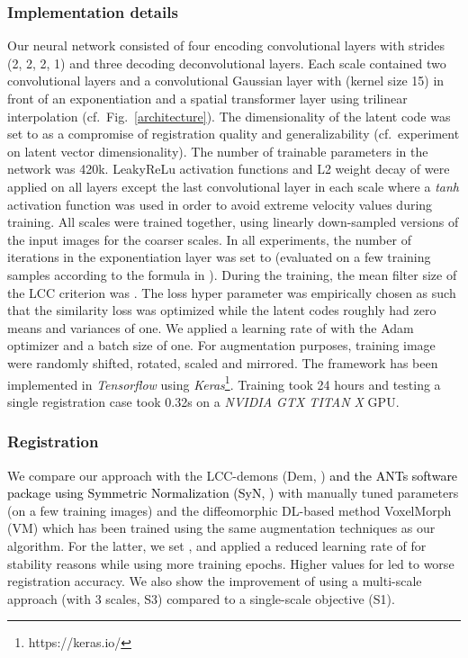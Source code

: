 \documentclass[journal]{IEEEtran}
\newcommand{\update}[1]{\textcolor{black}{#1}}
\begin{document}
\subsubsection{Implementation details} Our neural network consisted of four encoding convolutional layers with strides (2, 2, 2, 1) and three decoding deconvolutional layers. Each scale contained two convolutional layers and a convolutional Gaussian layer with  (kernel size 15) in front of an exponentiation and a spatial transformer layer using trilinear interpolation (cf.~Fig.\ \ref{architecture}). The dimensionality of the latent code  was set to  as a compromise of registration quality and generalizability (cf.\ experiment on latent vector dimensionality). The number of trainable parameters in the network was 420k. LeakyReLu activation functions and L2 weight decay of  were applied on all layers except the last convolutional layer in each scale where a \emph{tanh} activation function was used in order to avoid extreme velocity values during training. All scales were trained together, using linearly down-sampled versions of the input images for the coarser scales. In all experiments, the number of iterations in the exponentiation layer was set to   (evaluated on a few training samples according to the formula in \cite{arsigny2006log}). During the training, the mean filter size of the LCC criterion was . The loss hyper parameter was empirically chosen as  such that the similarity loss was optimized while the latent codes roughly had zero means and variances of one. We applied a learning rate of  with the Adam optimizer and a batch size of one. For augmentation purposes, training image were randomly shifted, rotated, scaled and mirrored. The framework has been implemented in \textit{Tensorflow} using \textit{Keras}\footnote{https://keras.io/}. Training took 24 hours and testing a single registration case took 0.32s on a \textit{NVIDIA GTX TITAN X} GPU. 

\subsubsection{Registration}
We compare our approach with the LCC-demons (Dem, \cite{lorenzi2013lcc}) \update{and the ANTs software package using Symmetric Normalization (SyN, \cite{avants2008symmetric})} with manually tuned parameters (on a few training images) and the diffeomorphic DL-based method VoxelMorph \cite{dalca2018unsupervised} (VM) which has been trained using the same augmentation techniques as our algorithm. For the latter, we set ,  and applied a reduced learning rate of  for stability reasons while using more training epochs. Higher values for  led to worse registration accuracy. We also show the improvement of using a multi-scale approach (with 3 scales, S3) compared to a single-scale objective (S1). 
\end{document}
